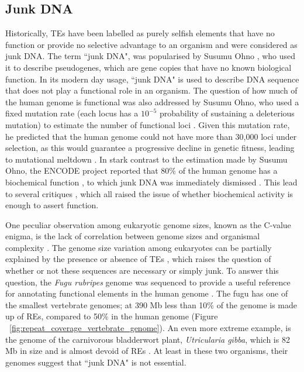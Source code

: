 \subsection{Junk DNA}

Historically, TEs have been labelled as purely selfish elements that have no function or provide no selective advantage to an organism \citep{doolittle1980selfish, orgel1980selfish} and were considered as junk DNA. The term ``junk DNA", was popularised by Susumu Ohno \citep{pmid5065367}, who used it to describe pseudogenes, which are gene copies that have no known biological function. In its modern day usage, ``junk DNA" is used to describe DNA sequence that does not play a functional role in an organism. The question of how much of the human genome is functional was also addressed by Susumu Ohno, who used a fixed mutation rate (each locus has a $10^{-5}$ probability of sustaining a deleterious mutation) to estimate the number of functional loci \citep{pmid5065367}. Given this mutation rate, he predicted that the human genome could not have more than 30,000 loci under selection, as this would guarantee a progressive decline in genetic fitness, leading to mutational meltdown \citep{pmid24809441}. In stark contrast to the estimation made by Susumu Ohno, the ENCODE project reported that 80\% of the human genome has a biochemical function \citep{pmid22955616}, to which junk DNA was immediately dismissed \citep{Pennisi07092012}. This lead to several critiques \citep{pmid23431001, pmid23479647, Eddy2012}, which all raised the issue of whether biochemical activity is enough to assert function.

One peculiar observation among eukaryotic genome sizes, known as the C-value enigma, is the lack of correlation between genome sizes and organismal complexity \citep{pmid11325054}. The genome size variation among eukaryotes can be partially explained by the presence or absence of TEs \citep{pmid12188048}, which raises the question of whether or not these sequences are necessary or simply junk. To answer this question, the \textit{Fugu rubripes} genome was sequenced to provide a useful reference for annotating functional elements in the human genome \citep{pmid12142439}. The fugu has one of the smallest vertebrate genomes; at 390 Mb less than 10\% of the genome is made up of REs, compared to 50\% in the human genome (Figure ~\ref{fig:repeat_coverage_vertebrate_genome}). An even more extreme example, is the genome of the carnivorous bladderwort plant, \textit{Utricularia gibba}, which is 82 Mb in size and is almost devoid of REs \citep{pmid23665961}. At least in these two organisms, their genomes suggest that ``junk DNA" is not essential.


